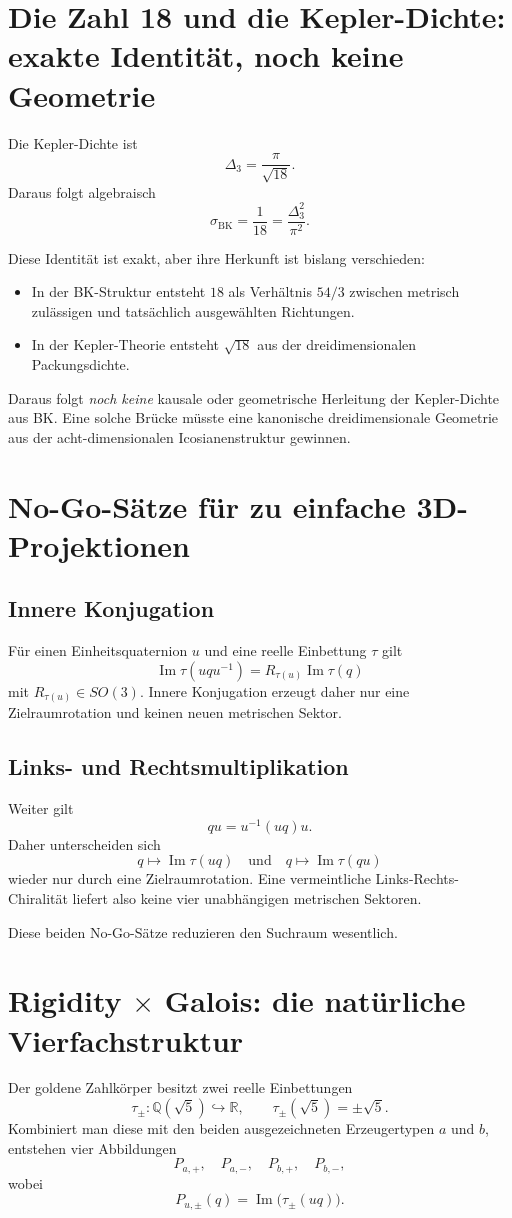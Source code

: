 \documentclass[11pt,a4paper]{article}
\theoremstyle{definition}
\theoremstyle{remark}
\newcommand{\BK}{\mathrm{BK}}
\newcommand{\QQ}{\mathbb Q}
\newcommand{\RR}{\mathbb R}
\begin{document}
\section{Die Zahl 18 und die Kepler-Dichte: exakte Identität, noch keine Geometrie}
Die Kepler-Dichte ist
\[
\Delta_3=\frac{\pi}{\sqrt{18}}.
\]
Daraus folgt algebraisch
\[
\boxed{
\sigma_{\BK}
=\frac1{18}
=\frac{\Delta_3^2}{\pi^2}.
}
\]

Diese Identität ist exakt, aber ihre Herkunft ist bislang verschieden:
\begin{itemize}
\item In der BK-Struktur entsteht $18$ als Verhältnis $54/3$ zwischen metrisch zulässigen und tatsächlich ausgewählten Richtungen.
\item In der Kepler-Theorie entsteht $\sqrt{18}$ aus der dreidimensionalen Packungsdichte.
\end{itemize}

Daraus folgt \emph{noch keine} kausale oder geometrische Herleitung der Kepler-Dichte aus BK. Eine solche Brücke müsste eine kanonische dreidimensionale Geometrie aus der acht-dimensionalen Icosianenstruktur gewinnen.

\section{No-Go-Sätze für zu einfache 3D-Projektionen}
\subsection{Innere Konjugation}
Für einen Einheitsquaternion $u$ und eine reelle Einbettung $\tau$ gilt
\[
\operatorname{Im}\tau(uqu^{-1})
=
R_{\tau(u)}\operatorname{Im}\tau(q)
\]
mit $R_{\tau(u)}\in SO(3)$. Innere Konjugation erzeugt daher nur eine Zielraumrotation und keinen neuen metrischen Sektor.

\subsection{Links- und Rechtsmultiplikation}
Weiter gilt
\[
qu=u^{-1}(uq)u.
\]
Daher unterscheiden sich
\[
q\mapsto\operatorname{Im}\tau(uq)
\quad\text{und}\quad
q\mapsto\operatorname{Im}\tau(qu)
\]
wieder nur durch eine Zielraumrotation. Eine vermeintliche Links-Rechts-Chiralität liefert also keine vier unabhängigen metrischen Sektoren.

Diese beiden No-Go-Sätze reduzieren den Suchraum wesentlich.

\section{Rigidity $\times$ Galois: die natürliche Vierfachstruktur}
Der goldene Zahlkörper besitzt zwei reelle Einbettungen
\[
\tau_\pm:\QQ(\sqrt5)\hookrightarrow\RR,
\qquad
\tau_\pm(\sqrt5)=\pm\sqrt5.
\]
Kombiniert man diese mit den beiden ausgezeichneten Erzeugertypen $a$ und $b$, entstehen vier Abbildungen
\[
P_{a,+},\quad P_{a,-},\quad P_{b,+},\quad P_{b,-},
\]
wobei
\[
P_{u,\pm}(q)=\operatorname{Im}\bigl(\tau_\pm(uq)\bigr).
\]
\end{document}
